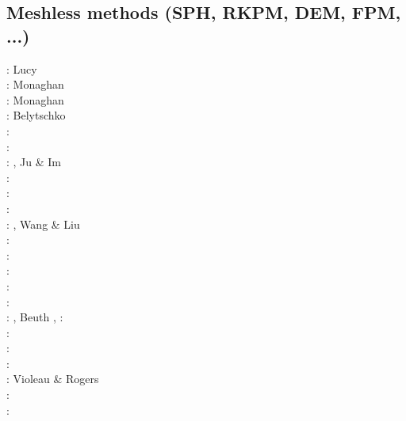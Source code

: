 \subsection{Meshless methods (SPH, RKPM, DEM, FPM, ...)}

\begin{scriptsize}
\nineteenseventyseven: Lucy \cite{lucy77}\\
\nineteeneightyfive: Monaghan \cite{mona85}\\
\nineteenninetytwo: Monaghan \cite{mona92}\\
\nineteenninetysix: Belytschko \etal \cite{beko96}\\
\nineteenninetyseven: \cite{mofz97}\\
\nineteenninetynine: \cite{zhfm99}\\
\twothousand: \cite{begl00}\cite{lihl00}, Ju \& Im \cite{juim00}\\
\twothousandone: \cite{idso01}\\
\twothousandtwo: \cite{lilr02}\cite{lill02}\cite{lili02}\\
\twothousandthree: \cite{lill03}\cite{mamo03}\\
\twothousandfour: \cite{hufl04}, Wang \& Liu \cite{wali04}\\
\twothousandfive: \cite{febh05}\cite{lixl05}\cite{thes05}\cite{thje05a}\cite{thje05b}\\
\twothousandsix: \cite{lili06}\cite{yabm06}\\
\twothousandseven: \cite{busf07}\\
\twothousandeight: \cite{bufs08}\cite{lemx08}\\
\twothousandten: \cite{dacl10}\\
\twothousandeleven: \cite{prcl11}\cite{kukg11}
                    \cite{kadm11}\cite{szpt11}
                    \cite{howt11}, Beuth \etal \cite{bewv11},
\twothousandtwelve: \cite{szpm12}\\
\twothousandthirteen: \cite{koau13}\cite{viau13}\\
\twothousandfourteen: \cite{dazs14}\cite{lekb14}\\
\twothousandfifteen: \cite{nifs15}\\
\twothousandsixteen: Violeau \& Rogers \cite{viro16}\\
\twothousandeighteen: \cite{krrk18}\cite{goej18}\\
\twothousandnineteen: \cite{meho19}\cite{meho19b}
\end{scriptsize}

